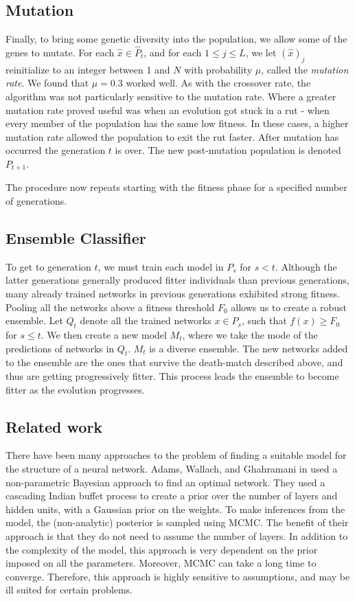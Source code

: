 \documentclass{article}
\DeclareMathOperator{\1}{\mathbbm{1}}
\begin{document}
\subsection{Mutation}
Finally, to bring some genetic diversity into the population, we allow some of the genes to mutate.
For each $\hat{x}\in\hat{P}_t$, and for each $1\leq j\leq L$,
we let $(\hat{x})_j$ reinitialize to an integer between 1 and $N$ with probability $\mu$,
called the \emph{mutation rate}. We found that $\mu = 0.3$ worked well.
As with the crossover rate, the algorithm was not particularly sensitive to the mutation rate. Where a greater mutation rate
proved useful was when an evolution got stuck in a rut - when every member of the population has the same low fitness.
In these cases, a higher mutation rate allowed the population to exit the rut faster.
After mutation has occurred the generation $t$ is over. The new post-mutation population is denoted $P_{t+1}$.

The procedure now repeats starting with the fitness phase for a specified number of generations.

\subsection{Ensemble Classifier}
To get to generation $t$, we must train each model in $P_s$ for $s<t$.
Although the latter generations generally produced fitter individuals than previous generations,
many already trained networks in previous generations exhibited strong fitness. 
Pooling all the networks above a fitness threshold $F_0$ allows us to create a robust ensemble.
Let $Q_t$ denote all the
trained networks $x\in P_s$, such that $f(x)\geq F_0$ for $s\leq t$. We then create a new model $M_t$, 
where we take the mode of the predictions of networks in $Q_t$. $M_t$ is a diverse ensemble. The new networks added to the ensemble
are the ones that survive the death-match described above, and thus are getting progressively fitter. This process leads the ensemble to
become fitter as the evolution progresses.

\subsection{Related work}
There have been many approaches to the problem of finding a suitable model for the structure of a neural network.
Adams, Wallach, and Ghahramani in \cite{adams} used a non-parametric Bayesian approach to find an optimal network.
They used a cascading Indian buffet process to create a prior over the number of layers and
hidden units, with a Gaussian prior on the weights. To make inferences from the model, the (non-analytic)
posterior is sampled using MCMC. The benefit of their approach is that they do not need to assume the number
of layers. In addition to the complexity of the model, this approach is very dependent on the prior imposed on all the parameters.
Moreover, MCMC can take a long time to converge. Therefore, this approach is highly sensitive to assumptions, and
may be ill suited for certain problems.
\end{document}
